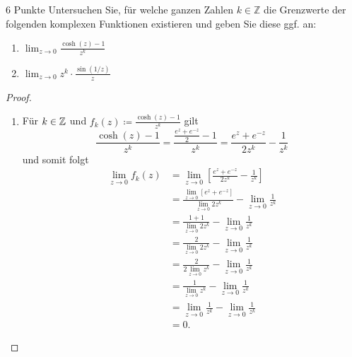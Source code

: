 \documentclass{problemset}
\begin{document}
\begin{problem}[Grenzwerte]{6 Punkte}
Untersuchen Sie, für welche ganzen Zahlen $k \in \mathbb{Z}$ die Grenzwerte der folgenden komplexen Funktionen existieren und geben Sie diese ggf. an:

\begin{enumerate}
    \item $\lim_{z \to 0} \frac{\cosh(z) - 1}{z^k}$

    \item $\lim_{z \to 0} z^k \cdot \frac{\sin(1/z)}{z}$
\end{enumerate}

\begin{proof}
    \leavevmode
    \begin{enumerate}
        \item Für $k \in \mathbb{Z}$ und $f_k(z) \coloneqq \frac{\cosh(z) - 1}{z^k}$ gilt \[
                  \frac{\cosh(z) - 1}{z^k} = \frac{\frac{e^z + e^{-z}}{2} - 1}{z^k} = \frac{e^z + e^{-z}}{2z^k} - \frac{1}{z^k}
              \] und somit folgt
              \begin{align*}
                  \lim_{z \to 0} f_k(z) & = \lim_{z \to 0} \left[ \frac{e^z + e^{-z}}{2z^k} - \frac{1}{z^k} \right]                               \\
                                        & = \frac{\lim_{z \to 0} \left[ e^z + e^{-z} \right]}{\lim_{z \to 0} 2z^k} - \lim_{z \to 0} \frac{1}{z^k} \\
                                        & = \frac{1 + 1}{\lim_{z \to 0} 2z^k} - \lim_{z \to 0} \frac{1}{z^k}                                      \\
                                        & = \frac{2}{\lim_{z \to 0} 2z^k} - \lim_{z \to 0} \frac{1}{z^k}                                          \\
                                        & = \frac{2}{2 \lim_{z \to 0} z^k} - \lim_{z \to 0} \frac{1}{z^k}                                         \\
                                        & = \frac{1}{\lim_{z \to 0} z^k} - \lim_{z \to 0} \frac{1}{z^k}                                           \\
                                        & = \lim_{z \to 0} \frac{1}{z^k} - \lim_{z \to 0} \frac{1}{z^k}                                           \\
                                        & = 0.
              \end{align*}


\end{enumerate}
\end{proof}
\end{problem}
\end{document}
